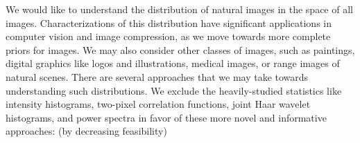 \documentclass[../notebook.tex]{subfiles}
\begin{document}

We would like to understand the distribution of natural images in the space of
all images. Characterizations of this distribution have significant applications
in computer vision and image compression, as we move towards more complete
priors for images. We may also consider other classes of images, such as
paintings, digital graphics like logos and illustrations, medical images, or
range images of natural scenes. There are several approaches that we may take
towards understanding such distributions. We exclude the heavily-studied
statistics like intensity histograms, two-pixel correlation functions, joint
Haar wavelet histograms, and power spectra in favor of these more novel and
informative approaches: (by decreasing feasibility)
\end{document}
